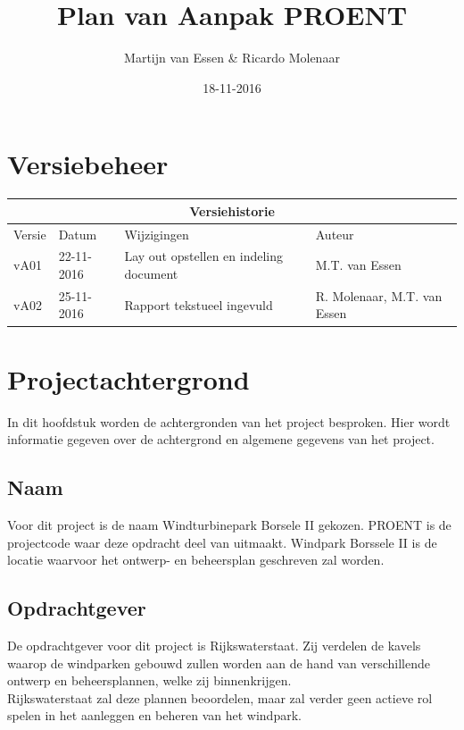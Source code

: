 \documentclass[numbers=endperiod]{scrartcl}
\title{Plan van Aanpak PROENT}
\date{18-11-2016}
\author{Martijn van Essen \& Ricardo Molenaar}
\newcommand{\sectionSmall}[1]{
	\vspace{-10pt}
	\section{#1}
	\vspace{-5pt}
}
\newcommand{\whitespace}{\vspace*{2 mm} \\}%
\begin{document}
	
	\newpage
	
	\setcounter{secnumdepth}{0} %
	\sectionSmall{Versiebeheer}
	
	\begin{center}
		\begin{tabular}{| p{4cm} | l | p{7cm} | p{25mm} |}
			\hline
			
			\multicolumn{4}{|c|}{
				\cellcolor{hhs_theme_heading_2}
				Versiehistorie
			}  \\ \hline
			
			Versie 	& Datum 		& Wijzigingen 	& Auteur \\ \hline
			vA01 	& 22-11-2016 	& Lay out opstellen en indeling document    & M.T. van Essen\\ \hline
			vA02    & 25-11-2016    & Rapport tekstueel ingevuld                & R. Molenaar, M.T. van Essen \\ \hline
		\end{tabular}
	\end{center}
	\newpage
	
	\setcounter{tocdepth}{2}%
	\tableofcontents
	\newpage
	
	\setcounter{secnumdepth}{3}%
	
	\sectionSmall{Projectachtergrond}
	In dit hoofdstuk worden de achtergronden van het project besproken. Hier wordt informatie gegeven over de achtergrond en algemene gegevens van het project.	
	\subsection{Naam}
	Voor dit project is de naam Windturbinepark Borsele II gekozen. PROENT is de projectcode waar deze opdracht deel van uitmaakt. Windpark Borssele II is de locatie waarvoor het ontwerp- en beheersplan geschreven zal worden.
	\subsection{Opdrachtgever}
	De opdrachtgever voor dit project is Rijkswaterstaat. Zij verdelen de kavels waarop de windparken gebouwd zullen worden aan de hand van verschillende ontwerp en beheersplannen, welke zij binnenkrijgen.
	\whitespace
	Rijkswaterstaat zal deze plannen beoordelen, maar zal verder geen actieve rol spelen in het aanleggen en beheren van het windpark.
\end{document}
